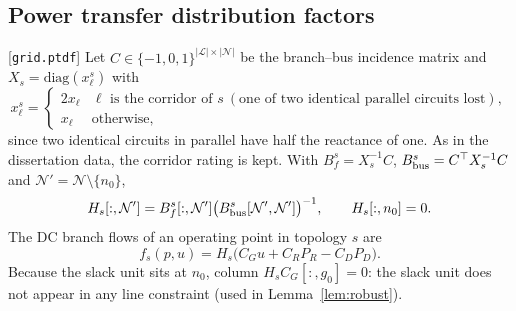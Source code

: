 \subsection{Power transfer distribution factors}
[\texttt{grid.ptdf}] Let $C\in\{-1,0,1\}^{|\mathcal L|\times|\mathcal N|}$ be the
branch--bus incidence matrix and $X_s=\mathrm{diag}(x^s_\ell)$ with
\begin{equation}
x^s_\ell=\begin{cases}2x_\ell & \ell \text{ is the corridor of } s\ (\text{one of two identical parallel circuits lost}),\\
x_\ell & \text{otherwise,}\end{cases}
\label{eq:xs}
\end{equation}
since two identical circuits in parallel have half the reactance of one. As in the
dissertation data, the corridor rating is kept.
With $B_f^s=X_s^{-1}C$, $B_{\rm bus}^s=C^\top X_s^{-1}C$ and $\mathcal N'=\mathcal N\setminus\{n_0\}$,
\begin{equation}
H_s[:,\mathcal N']=B_f^s[:,\mathcal N']\big(B^s_{\rm bus}[\mathcal N',\mathcal N']\big)^{-1},\qquad H_s[:,n_0]=0 .
\label{eq:ptdf}
\end{equation}
The DC branch flows of an operating point in topology $s$ are
\begin{equation}
f_s(p,u)=H_s\big(C_Gu+C_RP_R-C_DP_D\big).
\label{eq:flow}
\end{equation}
Because the slack unit sits at $n_0$, column $H_sC_G[:,g_0]=0$: the slack unit does not
appear in any line constraint (used in Lemma~\ref{lem:robust}).

